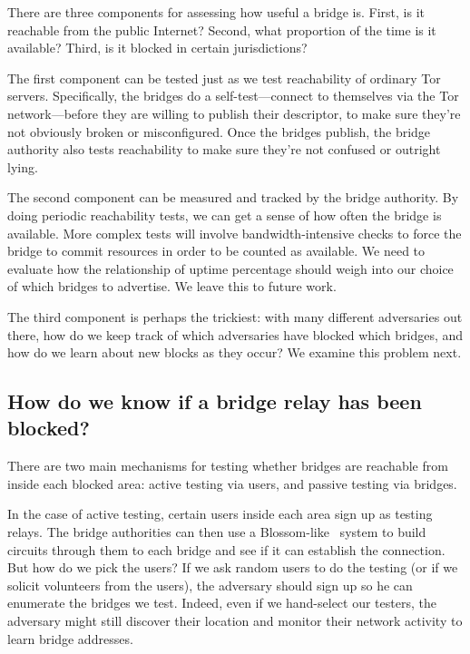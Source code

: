 \documentclass{llncs}
\begin{document}
There are three components for assessing how useful a bridge is. First,
is it reachable from the public Internet? Second, what proportion of
the time is it available? Third, is it blocked in certain jurisdictions?

The first component can be tested just as we test reachability of
ordinary Tor servers. Specifically, the bridges do a self-test---connect
to themselves via the Tor network---before they are willing to
publish their descriptor, to make sure they're not obviously broken or
misconfigured. Once the bridges publish, the bridge authority also tests
reachability to make sure they're not confused or outright lying.

The second component can be measured and tracked by the bridge authority.
By doing periodic reachability tests, we can get a sense of how often the
bridge is available. More complex tests will involve bandwidth-intensive
checks to force the bridge to commit resources in order to be counted as
available. We need to evaluate how the relationship of uptime percentage
should weigh into our choice of which bridges to advertise. We leave
this to future work.

The third component is perhaps the trickiest: with many different
adversaries out there, how do we keep track of which adversaries have
blocked which bridges, and how do we learn about new blocks as they
occur? We examine this problem next.

\subsection{How do we know if a bridge relay has been blocked?}
\label{subsec:geoip}

There are two main mechanisms for testing whether bridges are reachable
from inside each blocked area: active testing via users, and passive
testing via bridges.

In the case of active testing, certain users inside each area
sign up as testing relays. The bridge authorities can then use a
Blossom-like~\cite{blossom-thesis} system to build circuits through them
to each bridge and see if it can establish the connection. But how do
we pick the users? If we ask random users to do the testing (or if we
solicit volunteers from the users), the adversary should sign up so he
can enumerate the bridges we test. Indeed, even if we hand-select our
testers, the adversary might still discover their location and monitor
their network activity to learn bridge addresses.
\end{document}
